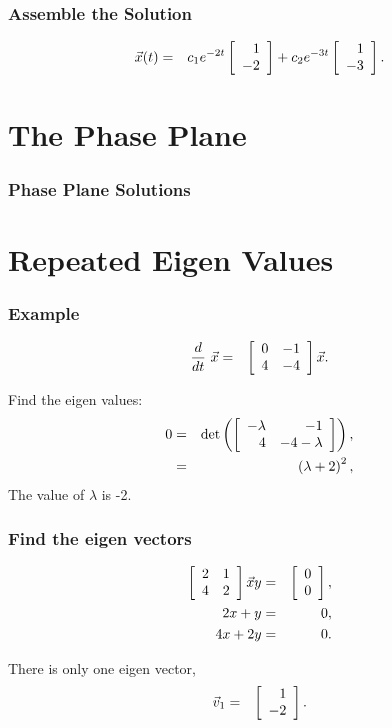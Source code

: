 \begin{frame}
  \frametitle{Assemble the Solution}

  \begin{eqnarray*}
    \vec{x}(t) & = & c_1 e^{-2t} \vecTwo{1}{-2} + c_2 e^{-3t} \vecTwo{1}{-3}.
  \end{eqnarray*}

\end{frame}


\section{The Phase Plane}

\begin{frame}
  \frametitle{Phase Plane Solutions}


\end{frame}

\section{Repeated Eigen Values}

\begin{frame}
  \frametitle{Example}

  \begin{eqnarray*}
    \deriv{~}{t} \vec{x} & = & \arrayTwo{0}{-1}{4}{-4} \vec{x}.
  \end{eqnarray*}

  {
    Find the eigen values:
    \begin{eqnarray*}
      0 & = & \det\lp\arrayTwo{-\lambda}{-1}{4}{-4-\lambda}\rp, \\
      & = & \lp \lambda + 2 \rp^2,
    \end{eqnarray*}
    The value of $\lambda$ is -2.
  }

\end{frame}


\begin{frame}
  \frametitle{Find the eigen vectors}

  \begin{eqnarray*}
    \arrayTwo{2}{1}{4}{2} \vec{x}{y} & = & \vecTwo{0}{0}, \\
    2x + y & = & 0, \\
    4x + 2y & = & 0.
  \end{eqnarray*}

  There is only one eigen vector,
  \begin{eqnarray*}
    \vec{v}_1 & = & \vecTwo{1}{-2}.
  \end{eqnarray*}

\end{frame}

